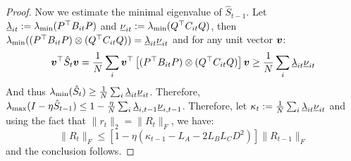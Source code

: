\begin{proof}
Now we estimate the minimal eigenvalue of $\hat S_{t-1}$. Let $\underline{\lambda}_{it} := \lambda_{\min}(P^\top B_{it} P)$ and $\underline{\nu}_{it} := \lambda_{\min}(Q^\top C_{it} Q)$, then $\lambda_{\min}((P^\top B_{it} P) \otimes (Q^\top C_{it} Q)) = \underline{\lambda}_{it}\underline{\nu}_{it}$ and for any unit vector ${\bm{v}}$: 
\begin{equation}
    {\bm{v}}^\top \hat S_t {\bm{v}} = \frac1N \sum_i {\bm{v}}^\top \left[(P^\top B_{it} P) \otimes (Q^\top C_{it} Q)\right]{\bm{v}} \ge \frac1N \sum_i \underline{\lambda}_{it}\underline{\nu}_{it} 
\end{equation}
And thus $\lambda_{\min}(\hat S_t) \ge \frac1N \sum_i \underline{\lambda}_{it}\underline{\nu}_{it}$. Therefore, $\lambda_{\max}(I - \eta \hat S_{t-1}) \le 1 - \frac{\eta}{N} \sum_i \underline{\lambda}_{i,t-1}\underline{\nu}_{i,t-1}$. Therefore, let $\kappa_t := \frac1N \sum_i \underline{\lambda}_{it}\underline{\nu}_{it}$ and using the fact that $\|r_t\|_2 = \|R_t\|_F$, we have: 
\begin{equation}
    \|R_t\|_F\le \left[1 - \eta (\kappa_{t-1} - L_A - 2L_BL_C D^2)\right] \|R_{t-1}\|_F
\end{equation}
and the conclusion follows. 
\end{proof}

